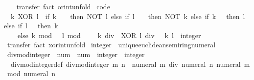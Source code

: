 \begin{isabellebody}
%
\isadelimproof
\ \ %
\endisadelimproof
%
\isatagproof
{}\isamarkupfalse%
\ transfer\ {\isacharparenleft}{\kern0pt}fact\ or{\isacharunderscore}{\kern0pt}int{\isacharunderscore}{\kern0pt}unfold{\isacharparenright}{\kern0pt}%
\endisatagproof
{\isafoldproof}%
%
\isadelimproof
\isanewline
%
\endisadelimproof
\isanewline
{}\isamarkupfalse%
\ {\isacharbrackleft}{\kern0pt}code{\isacharbrackright}{\kern0pt}{\isacharcolon}{\kern0pt}\isanewline
\ \ {\isacartoucheopen}k\ XOR\ l\ {\isacharequal}{\kern0pt}\ {\isacharparenleft}{\kern0pt}if\ k\ {\isacharequal}{\kern0pt}\ {\isacharminus}{\kern0pt}\ {}\ then\ NOT\ l\ else\ if\ l\ {\isacharequal}{\kern0pt}\ {\isacharminus}{\kern0pt}\ {}\ then\ NOT\ k\ else\ if\ k\ {\isacharequal}{\kern0pt}\ {}\ then\ l\ else\ if\ l\ {\isacharequal}{\kern0pt}\ {}\ then\ k\isanewline
\ \ \ \ else\ {\isasymbar}k\ mod\ {}\ {\isacharminus}{\kern0pt}\ l\ mod\ {}{\isasymbar}\ {\isacharplus}{\kern0pt}\ {}\ {\isacharasterisk}{\kern0pt}\ {\isacharparenleft}{\kern0pt}{\isacharparenleft}{\kern0pt}k\ div\ {}{\isacharparenright}{\kern0pt}\ XOR\ {\isacharparenleft}{\kern0pt}l\ div\ {}{\isacharparenright}{\kern0pt}{\isacharparenright}{\kern0pt}{\isacharparenright}{\kern0pt}{\isacartoucheclose}\ \ k\ l\ {\isacharcolon}{\kern0pt}{\isacharcolon}{\kern0pt}\ integer\isanewline
%
\isadelimproof
\ \ %
\endisadelimproof
%
\isatagproof
{}\isamarkupfalse%
\ transfer\ {\isacharparenleft}{\kern0pt}fact\ xor{\isacharunderscore}{\kern0pt}int{\isacharunderscore}{\kern0pt}unfold{\isacharparenright}{\kern0pt}%
\endisatagproof
{\isafoldproof}%
%
\isadelimproof
\isanewline
%
\endisadelimproof
\isanewline
{}\isamarkupfalse%
\isanewline
\isanewline
{}\isamarkupfalse%
\ integer\ {\isacharcolon}{\kern0pt}{\isacharcolon}{\kern0pt}\ unique{\isacharunderscore}{\kern0pt}euclidean{\isacharunderscore}{\kern0pt}semiring{\isacharunderscore}{\kern0pt}numeral\isanewline
{}\isanewline
\isanewline
{}\isamarkupfalse%
\ divmod{\isacharunderscore}{\kern0pt}integer\ {\isacharcolon}{\kern0pt}{\isacharcolon}{\kern0pt}\ {\isachardoublequoteopen}num\ {\isasymRightarrow}\ num\ {\isasymRightarrow}\ integer\ {\isasymtimes}\ integer{\isachardoublequoteclose}\isanewline
{}\isanewline
\ \ divmod{\isacharunderscore}{\kern0pt}integer{\isacharprime}{\kern0pt}{\isacharunderscore}{\kern0pt}def{\isacharcolon}{\kern0pt}\ {\isachardoublequoteopen}divmod{\isacharunderscore}{\kern0pt}integer\ m\ n\ {\isacharequal}{\kern0pt}\ {\isacharparenleft}{\kern0pt}numeral\ m\ div\ numeral\ n{\isacharcomma}{\kern0pt}\ numeral\ m\ mod\ numeral\ n{\isacharparenright}{\kern0pt}{\isachardoublequoteclose}\isanewline

\end{isabellebody}
